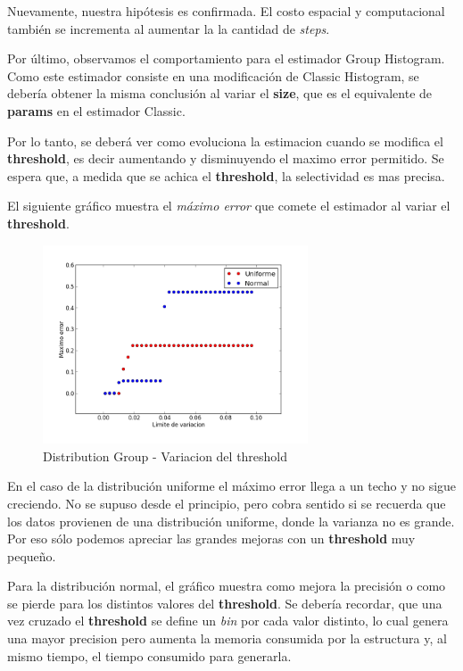 \documentclass[10pt, a4paper,english,spanish,hidelinks]{article}
\begin{document}
Nuevamente, nuestra hipótesis es confirmada. El costo espacial y computacional también se incrementa al aumentar la 
la cantidad de \textit{steps}.

Por último, observamos el comportamiento para el estimador Group Histogram. 
Como este estimador consiste en una modificación de Classic Histogram, se debería obtener la misma
conclusión al variar el \textbf{size}, que es el equivalente de \textbf{params} en el estimador Classic.

Por lo tanto, se deberá ver como evoluciona la estimacion cuando se modifica el
\textbf{threshold}, es decir aumentando y disminuyendo el maximo error permitido.
Se espera que, a medida que se achica el \textbf{threshold}, la selectividad es mas precisa.

El siguiente gráfico muestra el \textit{máximo error} que comete el estimador
al variar el \textbf{threshold}.
\newpage
\begin{figure}
  \centering
  \includegraphics[width=0.7\textwidth]{./imagenes/ejb2_group_parameter_variation.png}
  \caption{Distribution Group - Variacion del threshold}
\end{figure}


En el caso de la distribución uniforme el máximo error llega a un
techo y no sigue creciendo. No se supuso desde el principio, pero cobra sentido si
se recuerda que los datos provienen de una distribución uniforme, donde la varianza no es
grande. Por eso sólo podemos apreciar las grandes mejoras con un \textbf{threshold} muy pequeño.

Para la distribución normal, el gráfico muestra como mejora la precisión o como se pierde
para los distintos valores del \textbf{threshold}. Se debería recordar, que una vez cruzado el
\textbf{threshold} se define un \textit{bin} por cada valor distinto, lo cual genera una mayor
precision pero aumenta la memoria consumida por la estructura y, al mismo tiempo, el tiempo
consumido para generarla.
\end{document}
